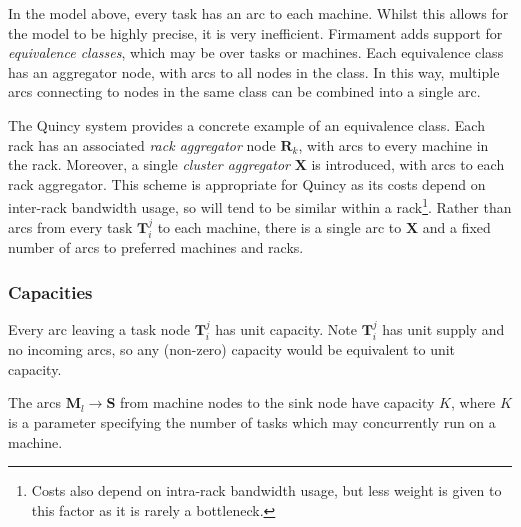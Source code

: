 In the model above, every task has an arc to each machine. Whilst this allows for the model to be highly precise, it is very inefficient\footnotemark.
Firmament adds support for \emph{equivalence classes}, which may be over tasks or machines. Each equivalence class has an aggregator node, with arcs to all nodes in the class. In this way, multiple arcs connecting to nodes in the same class can be combined into a single arc.

The Quincy system provides a concrete example of an equivalence class. Each rack has an associated \emph{rack aggregator} node $\mathbf{R}_k$, with arcs to every machine in the rack. Moreover, a single \emph{cluster aggregator} $\mathbf{X}$ is introduced, with arcs to each rack aggregator. This scheme is appropriate for Quincy as its costs depend on inter-rack bandwidth usage, so will tend to be similar within a rack\footnote{Costs also depend on intra-rack bandwidth usage, but less weight is given to this factor as it is rarely a bottleneck.}. Rather than arcs from every task $\mathbf{T}_i^j$ to each machine, there is a single arc to $\mathbf{X}$ and a fixed number of arcs to preferred machines and racks.

\subsubsection{Capacities}

Every arc leaving a task node $\mathbf{T}_i^j$ has unit capacity. Note $\mathbf{T}_i^j$ has unit supply and no incoming arcs, so any (non-zero) capacity would be equivalent to unit capacity.

The arcs $\mathbf{M}_l \to \mathbf{S}$ from machine nodes to the sink node have capacity $K$, where $K$ is a parameter specifying the number of tasks which may concurrently run on a machine\footnotemark.


